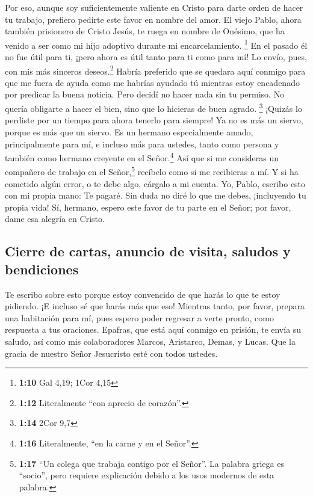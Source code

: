  Por eso, aunque soy suficientemente valiente en Cristo
para darte orden de hacer tu trabajo,  prefiero pedirte
este favor en nombre del amor. El viejo Pablo, ahora también prisionero
de Cristo Jesús,  te ruega en nombre de Onésimo, que ha
venido a ser como mi hijo adoptivo durante mi encarcelamiento.
\footnote{\textbf{1:10} Gal 4,19; 1Cor 4,15}  En el
pasado él no fue útil para ti, ¡pero ahora es útil tanto para ti como
para mí!  Lo envío, pues, con mis más sinceros
deseos.\footnote{\textbf{1:12} Literalmente ``con aprecio de corazón''.}
 Habría preferido que se quedara aquí conmigo para que me
fuera de ayuda como me habrías ayudado tú mientras estoy encadenado por
predicar la buena noticia.  Pero decidí no hacer nada sin
tu permiso. No quería obligarte a hacer el bien, sino que lo hicieras de
buen agrado. \footnote{\textbf{1:14} 2Cor 9,7}  ¡Quizás
lo perdiste por un tiempo para ahora tenerlo para siempre!
 Ya no es más un siervo, porque es más que un siervo. Es
un hermano especialmente amado, principalmente para mí, e incluso más
para ustedes, tanto como persona y también como hermano creyente en el
Señor.\footnote{\textbf{1:16} Literalmente, ``en la carne y en el
  Señor''.}  Así que si me consideras un compañero de
trabajo en el Señor,\footnote{\textbf{1:17} ``Un colega que trabaja
  contigo por el Señor''. La palabra griega es ``socio'', pero requiere
  explicación debido a los usos modernos de esta palabra.} recíbelo como
si me recibieras a mí.  Y si ha cometido algún error, o
te debe algo, cárgalo a mi cuenta.  Yo, Pablo, escribo
esto con mi propia mano: Te pagaré. Sin duda no diré lo que me debes,
¡incluyendo tu propia vida!  Sí, hermano, espero este
favor de tu parte en el Señor; por favor, dame esa alegría en Cristo.

\hypertarget{cierre-de-cartas-anuncio-de-visita-saludos-y-bendiciones}{%
\subsection{Cierre de cartas, anuncio de visita, saludos y
bendiciones}\label{cierre-de-cartas-anuncio-de-visita-saludos-y-bendiciones}}

 Te escribo sobre esto porque estoy convencido de que
harás lo que te estoy pidiendo. ¡E incluso sé que harás más que eso!
 Mientras tanto, por favor, prepara una habitación para
mí, pues espero poder regresar a verte pronto, como respuesta a tus
oraciones.  Epafras, que está aquí conmigo en prisión, te
envía su saludo,  así como mis colaboradores Marcos,
Aristarco, Demas, y Lucas.  Que la gracia de nuestro
Señor Jesucristo esté con todos ustedes.
